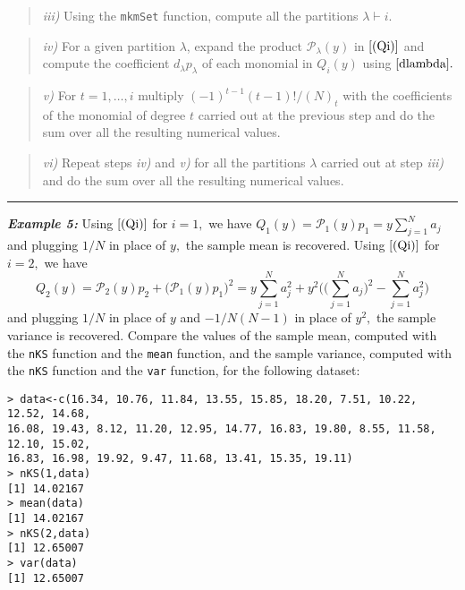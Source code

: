 \begin{quote}
\emph{iii)} Using the \texttt{mkmSet} function, compute all the partitions \(\lambda \vdash i.\)
\end{quote}

\begin{quote}
\emph{iv)} For a given partition \(\lambda\), expand the product \({\mathcal P}_{\lambda}(y)\) in \(\eqref{(Qi)}\) and compute the coefficient \(d_{\lambda} p_{\lambda}\) of each monomial in \(Q_i(y)\) using \(\eqref{dlambda}.\)
\end{quote}

\begin{quote}
\emph{v)} For \(t=1, \ldots, i\) multiply \((-1)^{t-1} (t-1)!/(N)_t\) with the coefficients of the monomial of degree \(t\) carried out at the previous step and do the sum over all the resulting numerical values.
\end{quote}

\begin{quote}
\emph{vi)} Repeat steps \emph{iv)} and \emph{v)} for all the partitions \(\lambda\) carried out at step \emph{iii)} and do the sum over all the resulting numerical values.
\end{quote}

\noindent

\rule{13cm}{0.4pt}

\hskip-0.5cm\textbf{\emph{Example 5:}} Using \(\eqref{(Qi)}\) for \(i=1,\) we have \(Q_1(y) = {\mathcal P}_1(y) p_1 = y \sum_{j=1}^N a_j\) and plugging \(1/N\) in place of \(y,\) the sample mean is recovered. Using \(\eqref{(Qi)}\) for \(i=2,\) we have
\[Q_2(y) = {\mathcal P}_2(y) p_2 +  \big({\mathcal P}_1(y) p_1\big)^2 =  y \sum_{j=1}^N a_j^2 + y^2 \bigg( \big(\sum_{j=1}^N a_j\big)^2 - \sum_{j=1}^N a_j^2\bigg)\]
and plugging \(1/N\) in place of \(y\) and \(-1/N(N-1)\) in place of \(y^2,\) the sample variance is recovered. Compare the values of the sample mean, computed with the \texttt{nKS} function and the \texttt{mean} function, and the sample variance, computed with the \texttt{nKS} function and the \texttt{var} function, for the following dataset:

\begin{verbatim}
> data<-c(16.34, 10.76, 11.84, 13.55, 15.85, 18.20, 7.51, 10.22, 12.52, 14.68, 
16.08, 19.43, 8.12, 11.20, 12.95, 14.77, 16.83, 19.80, 8.55, 11.58, 12.10, 15.02, 
16.83, 16.98, 19.92, 9.47, 11.68, 13.41, 15.35, 19.11)
> nKS(1,data)
[1] 14.02167
> mean(data)
[1] 14.02167
> nKS(2,data)
[1] 12.65007
> var(data)
[1] 12.65007
\end{verbatim}

